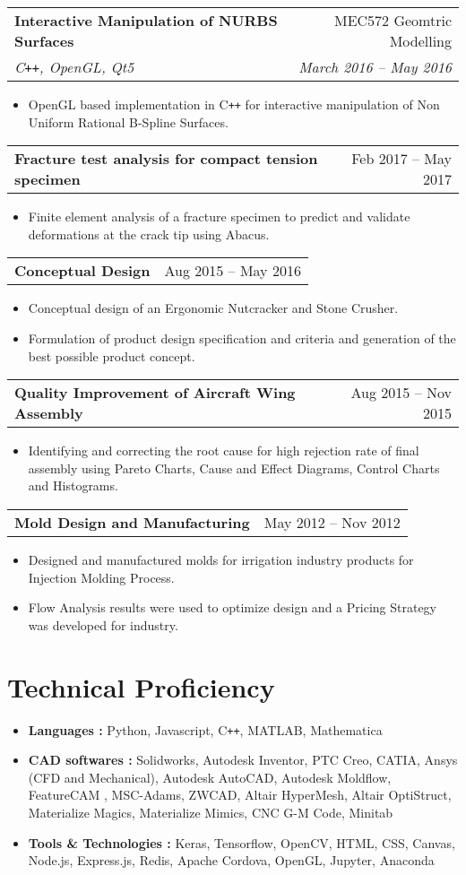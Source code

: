 \documentclass[letterpaper,10pt]{article}
\makeatletter
\newcommand{\resumeHeading}[4]{
  \vspace{-1pt}
    \begin{tabular*}{0.97\textwidth}{l@{\extracolsep{\fill}}r}
      \textbf{#1} & #2 \vspace{-2pt}\\ \vspace{1pt}
      \textit{\small#3} & \textit{\small #4} \\
    \end{tabular*}
}
\newcommand{\resumeHeadingwithDate}[2]{
	\vspace{-1pt}
	\begin{tabular*}{0.97\textwidth}{l@{\extracolsep{\fill}}r}
		\textbf{#1} & #2 \vspace{-2pt}\\
	\end{tabular*}
	\vspace{+2pt}
}
\newcommand{\resumeSection}[1]{
\vspace{-12pt}
\section{\textbf{#1}}
}
\newcommand{\resumeItemListStart}{
\vspace{-7pt}
\begin{itemize}[leftmargin=14pt]
}
\newcommand{\resumeItemListEnd}{
\vspace{+7pt}
\end{itemize}
}
\newcommand{\resumeItem}[1]{
  \item\small{
      {#1 \vspace{-7pt}
      }
  }
}
\makeatother
\begin{document}
	\vspace{-2pt}
	\resumeHeading{Interactive Manipulation of NURBS Surfaces}{MEC572 Geomtric Modelling}{C\texttt{++}, OpenGL, Qt5}{March 2016 -- May 2016}
	\resumeItemListStart
	\resumeItem{OpenGL based implementation in C\texttt{++} for interactive manipulation of Non Uniform Rational B-Spline Surfaces.}
	\resumeItemListEnd
	
	\resumeHeadingwithDate{Fracture test analysis for compact tension specimen}{Feb 2017 -- May 2017}
	\resumeItemListStart
	\resumeItem{Finite element analysis of a fracture specimen to predict and validate deformations at the crack tip using Abacus.}
	\resumeItemListEnd
	
	\vspace{-4pt}
	\resumeHeadingwithDate{Conceptual Design}{Aug 2015 -- May 2016}
	\resumeItemListStart
	\resumeItem{Conceptual design of an Ergonomic Nutcracker and Stone Crusher.}
	\resumeItem{Formulation of product design specification and criteria and generation of the best possible product concept.}
	\resumeItemListEnd
	
	\vspace{-4pt}
	\resumeHeadingwithDate{Quality Improvement of Aircraft Wing Assembly}{Aug 2015 -- Nov 2015}
	\resumeItemListStart
	\resumeItem{Identifying and correcting the root cause for high rejection rate of final assembly using Pareto Charts, Cause and Effect Diagrams, Control Charts and Histograms.}
	\resumeItemListEnd
	
	\vspace{-4pt}
	\resumeHeadingwithDate{Mold Design and Manufacturing}{May 2012 -- Nov 2012}
	\resumeItemListStart
	\resumeItem{Designed and manufactured molds for irrigation industry products for Injection Molding Process.}
	\resumeItem{Flow Analysis results were used to optimize design and a Pricing Strategy was developed for industry.}
	\resumeItemListEnd
    
    
    
\resumeSection{Technical Proficiency}
    \vspace{+7pt}
    \resumeItemListStart
    \resumeItem{\textbf{Languages :} Python, Javascript, C\texttt{++}, MATLAB, Mathematica}
    \resumeItem{\textbf{CAD softwares :} Solidworks, Autodesk Inventor, PTC Creo, CATIA, Ansys (CFD and Mechanical), Autodesk AutoCAD, Autodesk Moldflow, FeatureCAM , MSC-Adams, ZWCAD, Altair HyperMesh, Altair OptiStruct, Materialize Magics, Materialize Mimics, CNC G-M Code, Minitab}
    \resumeItem{\textbf{Tools \& Technologies :} Keras, Tensorflow, OpenCV, HTML, CSS, Canvas, Node.js, Express.js, Redis, Apache Cordova, OpenGL, Jupyter, Anaconda}
    \resumeItemListEnd
    
\end{document}
